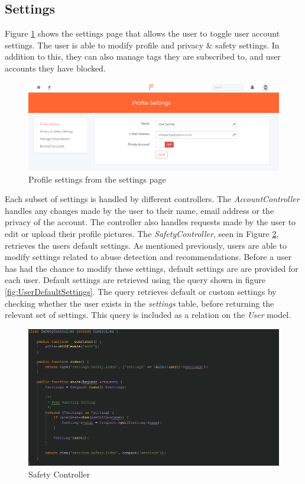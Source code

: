 \subsection{Settings}
Figure \ref{fig:SettingsImplementation} shows the settings page that allows the user to toggle user account settings. The user is able to modify profile and privacy \& safety settings. In addition to this, they can also manage tags they are subscribed to, and user accounts they have blocked.

\begin{figure}[H]
\centering
\includegraphics[width=\textwidth]{Images/Implementation/SettingsPage}
\caption{Profile settings from the settings page}
\label{fig:SettingsImplementation}
\end{figure}

Each subset of settings is handled by different controllers. The \textit{AccountController} handles any changes made by the user to their name, email address or the privacy of the account. The controller also handles requests made by the user to edit or upload their profile pictures. The \textit{SafetyController}, seen in Figure \ref{fig:SafetyController}, retrieves the users default settings. As mentioned previously, users are able to modify settings related to abuse detection and recommendations. Before a user has had the chance to modify these settings, default settings are are provided for each user. Default settings are retrieved using the query shown in figure \ref{fig:UserDefaultSettings}. The query retrieves default or custom settings by checking whether the user exists in the \emph{settings} table, before returning the relevant set of settings. This query is included as a relation on the \emph{User} model.

\begin{figure}[H]
\centering
\includegraphics[width=\textwidth]{Images/Implementation/SafetyController}
\caption{Safety Controller}
\label{fig:SafetyController}
\end{figure}

